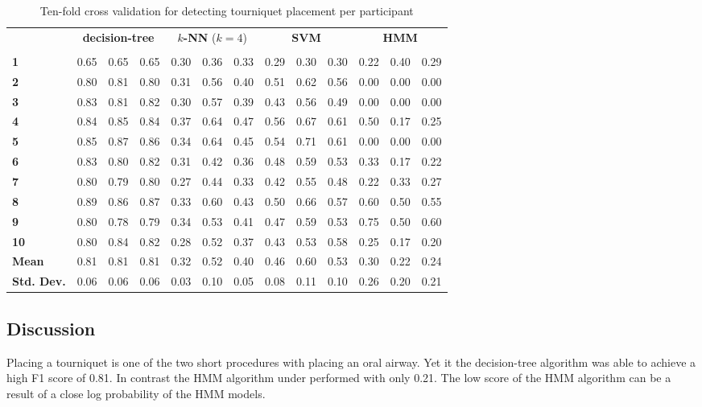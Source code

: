 \begin{table}[]
	\centering
	\begin{tabular}{lllllllllllll}
		\multirow{2}{*}{\rotatebox[origin=c]{45}{\textbf{Participant}}} & \multicolumn{3}{c}{\textbf{decision-tree}} & \multicolumn{3}{c}{\textbf{$k$-NN} ($k=4$)} & \multicolumn{3}{c}{\textbf{SVM}} & \multicolumn{3}{c}{\textbf{HMM}} \\
		 & \rot{Precision}     & \rot{Recall}    & \rot{F1}    & \rot{Precision}     & \rot{Recall}    & \rot{F1}  & \rot{Precision}     & \rot{Recall}    & \rot{F1} & \rot{Precision}     & \rot{Recall}    & \rot{F1} \\
		\textbf{1}   & 0.65 & 0.65 & 0.65 & 0.30 & 0.36 & 0.33 & 0.29 & 0.30 & 0.30 & 0.22 & 0.40 & 0.29 \\
		\textbf{2}   & 0.80 & 0.81 & 0.80 & 0.31 & 0.56 & 0.40 & 0.51 & 0.62 & 0.56 & 0.00 & 0.00 & 0.00 \\
		\textbf{3}   & 0.83 & 0.81 & 0.82 & 0.30 & 0.57 & 0.39 & 0.43 & 0.56 & 0.49 & 0.00 & 0.00 & 0.00 \\
		\textbf{4}   & 0.84 & 0.85 & 0.84 & 0.37 & 0.64 & 0.47 & 0.56 & 0.67 & 0.61 & 0.50 & 0.17 & 0.25 \\
		\textbf{5}   & 0.85 & 0.87 & 0.86 & 0.34 & 0.64 & 0.45 & 0.54 & 0.71 & 0.61 & 0.00 & 0.00 & 0.00 \\
		\textbf{6}   & 0.83 & 0.80 & 0.82 & 0.31 & 0.42 & 0.36 & 0.48 & 0.59 & 0.53 & 0.33 & 0.17 & 0.22 \\
		\textbf{7}   & 0.80 & 0.79 & 0.80 & 0.27 & 0.44 & 0.33 & 0.42 & 0.55 & 0.48 & 0.22 & 0.33 & 0.27 \\
		\textbf{8}   & 0.89 & 0.86 & 0.87 & 0.33 & 0.60 & 0.43 & 0.50 & 0.66 & 0.57 & 0.60 & 0.50 & 0.55 \\
		\textbf{9}   & 0.80 & 0.78 & 0.79 & 0.34 & 0.53 & 0.41 & 0.47 & 0.59 & 0.53 & 0.75 & 0.50 & 0.60 \\
		\textbf{10} & 0.80 & 0.84 & 0.82 & 0.28 & 0.52 & 0.37 & 0.43 & 0.53 & 0.58 & 0.25 & 0.17 & 0.20 \\
		\hline
		\textbf{Mean} & 0.81 & 0.81 & 0.81 & 0.32 & 0.52 & 0.40 & 0.46 & 0.60 & 0.53 & 0.30 & 0.22 & 0.24 \\
		\textbf{Std. Dev.} & 0.06 & 0.06 & 0.06 & 0.03 & 0.10 & 0.05 & 0.08 & 0.11 & 0.10 & 0.26 & 0.20 & 0.21
	\end{tabular}
	\caption{Ten-fold cross validation for detecting tourniquet placement per participant}
	\label{tab:t:ml}
\end{table}
\subsection{Discussion}
\label{sec:Results:Tourniquet:Discussion}
Placing a tourniquet is one of the two short procedures with placing an oral airway. Yet it the decision-tree algorithm was able to achieve a high F1 score of 0.81. In contrast the HMM algorithm under performed with only 0.21. The low score of the HMM algorithm can be a result of a close log probability of the HMM models.

